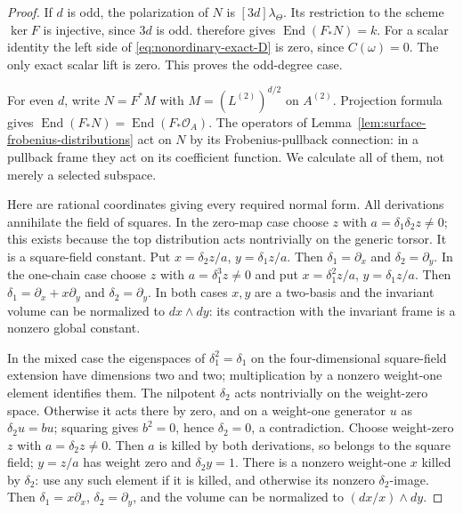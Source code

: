 \begin{proof}
If $d$ is odd, the polarization of $N$ is $[3d]\lambda_\Theta$.
Its restriction to the scheme $\ker F$ is injective, since $3d$ is odd.
\citet[Theorem~1.2(i), p.~45, with proof on pp.~43--45]{Oda1971}
therefore gives $\operatorname{End}(F_*N)=k$.
For a scalar identity the left side of
\eqref{eq:nonordinary-exact-D} is zero, since $C(\omega)=0$.
The only exact scalar lift is zero. This proves the odd-degree case.

For even $d$, write $N=F^*M$ with
$M=(L^{(2)})^{d/2}$ on $A^{(2)}$.
Projection formula gives
$\operatorname{End}(F_*N)=\operatorname{End}(F_*\mathcal O_A)$.
The operators of Lemma~\ref{lem:surface-frobenius-distributions}
act on $N$ by its Frobenius-pullback connection: in a pullback frame
they act on its coefficient function. We calculate all of them,
not merely a selected subspace.

Here are rational coordinates giving every required normal form.
All derivations annihilate the field of squares. In the zero-map
case choose $z$ with $a=\delta_1\delta_2z\ne0$; this exists because
the top distribution acts nontrivially on the generic torsor.
It is a square-field constant. Put
$x=\delta_2z/a$, $y=\delta_1z/a$. Then
$\delta_1=\partial_x$ and $\delta_2=\partial_y$.
In the one-chain case choose $z$ with $a=\delta_1^3z\ne0$ and put
$x=\delta_1^2z/a$, $y=\delta_1z/a$.
Then $\delta_1=\partial_x+x\partial_y$ and
$\delta_2=\partial_y$. In both cases $x,y$ are a two-basis and
the invariant volume can be normalized to $dx\wedge dy$:
its contraction with the invariant frame is a nonzero global constant.

In the mixed case the eigenspaces of $\delta_1^2=\delta_1$ on the
four-dimensional square-field extension have dimensions two and two;
multiplication by a nonzero weight-one element identifies them.
The nilpotent $\delta_2$ acts nontrivially on the weight-zero space.
Otherwise it acts there by zero, and on a weight-one generator $u$
as $\delta_2u=bu$; squaring gives $b^2=0$, hence $\delta_2=0$,
a contradiction. Choose weight-zero $z$ with $a=\delta_2z\ne0$.
Then $a$ is killed by both derivations, so belongs to the square field;
$y=z/a$ has weight zero and $\delta_2y=1$.
There is a nonzero weight-one $x$ killed by $\delta_2$: use any such
element if it is killed, and otherwise its nonzero $\delta_2$-image.
Then $\delta_1=x\partial_x$, $\delta_2=\partial_y$, and the volume
can be normalized to $(dx/x)\wedge dy$.


\end{proof}

